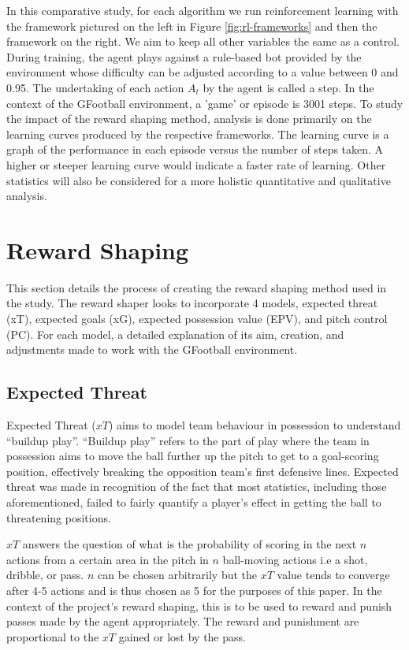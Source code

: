 \documentclass[11pt]{article}
\begin{document}
In this comparative study, for each algorithm we run reinforcement learning with the framework pictured on the left in Figure \ref{fig:rl-frameworks} and then the framework on the right. We aim to keep all other variables the same as a control.
During training, the agent plays against a rule-based bot provided by the environment whose difficulty can be adjusted according to a value between 0 and 0.95. 
The undertaking of each action $A_t$ by the agent is called a step. In the context of the GFootball environment, a 'game' or episode is 3001 steps.
To study the impact of the reward shaping method, analysis is done primarily on the learning curves produced by the respective frameworks. The learning curve is a graph of the performance in each episode versus the number of steps taken. A higher or steeper learning curve would indicate a faster rate of learning. Other statistics will also be considered for a more holistic quantitative and qualitative analysis. 

\section{Reward Shaping}
This section details the process of creating the reward shaping method used in the study. The reward shaper looks to incorporate 4 models, expected threat (xT), expected goals (xG), expected possession value (EPV), and pitch control (PC). For each model, a detailed explanation of its aim, creation, and adjustments made to work with the GFootball environment.

\subsection{Expected Threat}

Expected Threat ($xT$) \cite{karun_introducing_2019} aims to model team behaviour in possession to understand “buildup play”. “Buildup play” refers to the part of play where the team in possession aims to move the ball further up the pitch to get to a goal-scoring position, effectively breaking the opposition team’s first defensive lines. Expected threat was made in recognition of the fact that most statistics, including those aforementioned, failed to fairly quantify a player’s effect in getting the ball to threatening positions.

$xT$ answers the question of what is the probability of scoring in the next $n$ actions from a certain area in the pitch in $n$ ball-moving actions i.e a shot, dribble, or pass. $n$ can be chosen arbitrarily but the $xT$ value tends to converge after 4-5 actions and is thus chosen as 5 for the purposes of this paper.
In the context of the project's reward shaping, this is to be used to reward and punish passes made by the agent appropriately. The reward and punishment are proportional to the $xT$ gained or lost by the pass.
\end{document}
